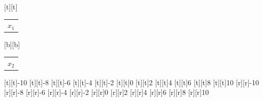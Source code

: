 %    
%
%
\begin{psfrags}%
\psfragscanon%
%
[t][t]{\color[rgb]{0,0,0}\setlength{\tabcolsep}{0pt}\begin{tabular}{c}$x_1$\end{tabular}}%
[b][b]{\color[rgb]{0,0,0}\setlength{\tabcolsep}{0pt}\begin{tabular}{c}$x_2$\end{tabular}}%
%
[t][t]{-10}%
[t][t]{-8}%
[t][t]{-6}%
[t][t]{-4}%
[t][t]{-2}%
[t][t]{0}%
[t][t]{2}%
[t][t]{4}%
[t][t]{6}%
[t][t]{8}%
[t][t]{10}%
%
[r][r]{-10}%
[r][r]{-8}%
[r][r]{-6}%
[r][r]{-4}%
[r][r]{-2}%
[r][r]{0}%
[r][r]{2}%
[r][r]{4}%
[r][r]{6}%
[r][r]{8}%
[r][r]{10}%
%
%
\end{psfrags}%
%
